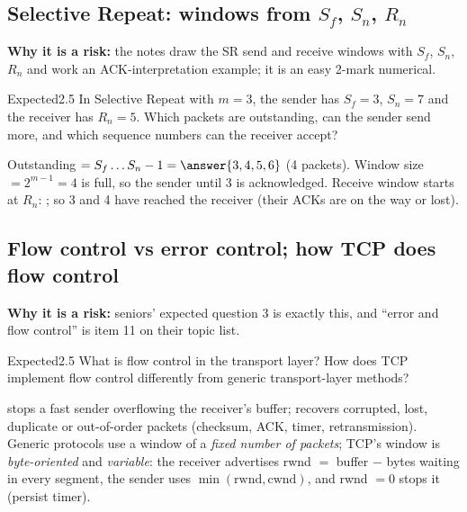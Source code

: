 \subsection{Selective Repeat: windows from $S_f$, $S_n$, $R_n$}\label{iq:C27}
   

\textbf{Why it is a risk:} the notes draw the SR send and receive windows with $S_f$, $S_n$, $R_n$ and work an ACK-interpretation example; it is an easy 2-mark numerical.
\begin{question}{Expected}{2.5}
In Selective Repeat with $m=3$, the sender has $S_f=3$, $S_n=7$ and the receiver has $R_n=5$. Which packets are outstanding, can the sender send more, and which sequence numbers can the receiver accept?
\end{question}
\begin{solution}
Outstanding $=S_f\ldots S_n-1=\answer{3, 4, 5, 6}$ (4 packets). Window size $=2^{m-1}=4$ is full, so the sender  until 3 is acknowledged. Receive window starts at $R_n$: ; so 3 and 4 have reached the receiver (their ACKs are on the way or lost).
\begin{center}
\end{center}
\end{solution}

\subsection{Flow control vs error control; how TCP does flow control}\label{iq:C21}
   

\textbf{Why it is a risk:} seniors' expected question 3 is exactly this, and ``error and flow control'' is item 11 on their topic list.
\begin{question}{Expected}{2.5}
What is flow control in the transport layer? How does TCP implement flow control differently from generic transport-layer methods?
\end{question}
\begin{solution}
 stops a fast sender overflowing the receiver's buffer;  recovers corrupted, lost, duplicate or out-of-order packets (checksum, ACK, timer, retransmission). Generic protocols use a window of a \emph{fixed number of packets}; TCP's window is \emph{byte-oriented} and \emph{variable}: the receiver advertises rwnd $=$ buffer $-$ bytes waiting in every segment, the sender uses $\min(\text{rwnd},\text{cwnd})$, and rwnd $=0$ stops it (persist timer).
\end{solution}

